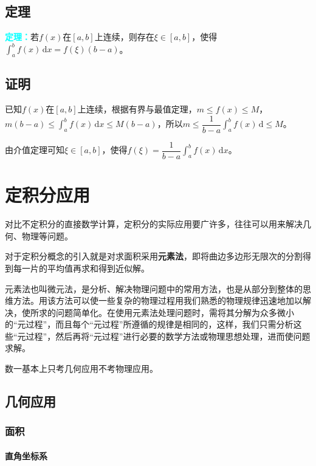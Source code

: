 \documentclass[UTF8, 12pt]{ctexart}
\begin{document}
        \subsection{定理}

        \textcolor{aqua}{\textbf{定理：}}若$f(x)$在$[a,b]$上连续，则存在$\xi\in[a,b]$，使得$\int_a^bf(x)\,\textrm{d}x=f(\xi)(b-a)$。

        \subsection{证明}

        已知$f(x)$在$[a,b]$上连续，根据有界与最值定理，$m\leqslant f(x)\leqslant M$，$m(b-a)\leqslant\int_a^bf(x)\,\textrm{d}x\leqslant M(b-a)$，所以$m\leqslant\dfrac{1}{b-a}\int_a^bf(x)\,\textrm{d}\leqslant M$。

        由介值定理可知$\xi\in[a,b]$，使得$f(\xi)=\dfrac{1}{b-a}\int_a^bf(x)\,\textrm{d}x$。

        \section{定积分应用}

        对比不定积分的直接数学计算，定积分的实际应用要广许多，往往可以用来解决几何、物理等问题。

        对于定积分概念的引入就是对求面积采用\textbf{元素法}，即将曲边多边形无限次的分割得到每一片的平均值再求和得到近似解。

        元素法也叫微元法，是分析、解决物理问题中的常用方法，也是从部分到整体的思维方法。用该方法可以使一些复杂的物理过程用我们熟悉的物理规律迅速地加以解决，使所求的问题简单化。在使用元素法处理问题时，需将其分解为众多微小的“元过程”，而且每个“元过程”所遵循的规律是相同的，这样，我们只需分析这些“元过程”，然后再将“元过程”进行必要的数学方法或物理思想处理，进而使问题求解。

        数一基本上只考几何应用不考物理应用。

        \subsection{几何应用}

        \subsubsection{面积}

        \paragraph{直角坐标系} \leavevmode \medskip
\end{document}
